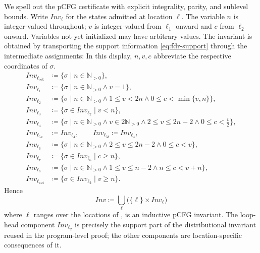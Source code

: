 We spell out the pCFG certificate with explicit integrality, parity,
and sublevel bounds. Write
$\mathit{Inv}_\ell$ for the states admitted at location $\ell$. The variable $n$ is integer-valued throughout; $v$ is integer-valued
from $\ell_1$ onward and $c$ from $\ell_2$ onward. Variables not yet
initialized may have arbitrary values.  The invariant
is obtained by transporting the support information
\eqref{eq:fdr-support} through the intermediate assignments:
In this display, $n,v,c$ abbreviate the respective coordinates of $\sigma$.
\begin{align*}
 \mathit{Inv}_{\ell_{\mathsf{init}}}
   &\coloneqq \{\sigma \mid n\in\mathbb{N}_{>0}\},\\
 \mathit{Inv}_{\ell_1}
   &\coloneqq \{\sigma \mid n\in\mathbb{N}_{>0}
                    \land v=1\},\\
 \mathit{Inv}_{\ell_2}
   &\coloneqq \{\sigma \mid n\in\mathbb{N}_{>0}
                    \land 1\leq v<2n
                    \land 0\leq c<\min\{v,n\}\},\\
 \mathit{Inv}_{\ell_3}
   &\coloneqq \{\sigma\in\mathit{Inv}_{\ell_2}\mid
                    v<n\},\\
 \mathit{Inv}_{\ell_4}
   &\coloneqq \{\sigma \mid n\in\mathbb{N}_{>0}
                    \land v\in2\mathbb N_{>0}
                    \land 2\leq v\leq2n-2
                    \land 0\leq c<\tfrac{v}2\},\\
 \mathit{Inv}_{\ell_{5a}}
   &\coloneqq \mathit{Inv}_{\ell_4},
 \qquad
 \mathit{Inv}_{\ell_{5b}}
   \coloneqq \mathit{Inv}_{\ell_4},\\
 \mathit{Inv}_{\ell_6}
   &\coloneqq \{\sigma \mid n\in\mathbb{N}_{>0}
                    \land 2\leq v\leq2n-2
                    \land 0\leq c<v\},\\
 \mathit{Inv}_{\ell_7}
   &\coloneqq \{\sigma\in\mathit{Inv}_{\ell_6}\mid
                   c\geq n\},\\
 \mathit{Inv}_{\ell_8}
   &\coloneqq \{\sigma \mid n\in\mathbb{N}_{>0}
                    \land 1\leq v\leq n-2
                    \land n\leq c<v+n\},\\
 \mathit{Inv}_{\ell_{\mathsf{out}}}
   &\coloneqq \{\sigma\in\mathit{Inv}_{\ell_2}\mid
                    v\geq n\}.
\end{align*}
Hence
\[
    \mathit{Inv}
    \coloneqq
    \bigcup_{\ell}
    \bigl(\{\ell\}\times\mathit{Inv}_{\ell}\bigr)
\]
where $\ell$ ranges over the locations of ,
is an inductive pCFG invariant. The loop-head component
$\mathit{Inv}_{\ell_2}$ is precisely the support part of the distributional
invariant reused in the program-level proof; the other components are
location-specific consequences of it.

